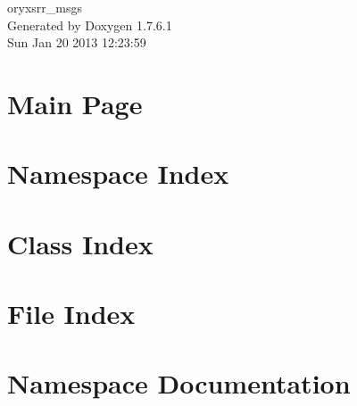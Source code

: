 \documentclass[a4paper]{book}
\begin{document}
\begin{titlepage}
\vspace*{7cm}
\begin{center}
{\Large oryxsrr\-\_\-msgs }\\
\vspace*{1cm}
{\large \-Generated by Doxygen 1.7.6.1}\\
\vspace*{0.5cm}
{\small Sun Jan 20 2013 12:23:59}\\
\end{center}
\end{titlepage}
\clearemptydoublepage
{}
\tableofcontents
\clearemptydoublepage
{}
\chapter{\-Main \-Page}
\label{index}
\chapter{\-Namespace \-Index}

\chapter{\-Class \-Index}

\chapter{\-File \-Index}

\chapter{\-Namespace \-Documentation}
















\end{document}
